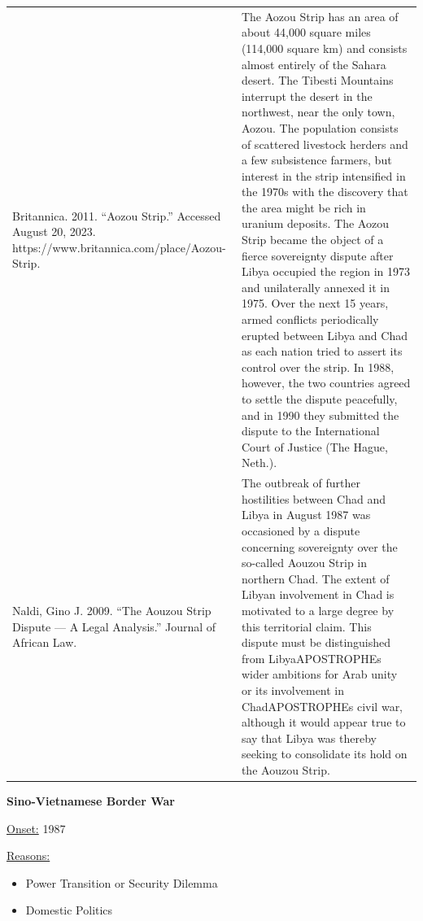 {\begin{longtable}{p{}p{}}
\\
Britannica. 2011. “Aozou Strip.” Accessed August 20, 2023. https://www.britannica.com/place/Aozou-Strip. & The Aozou Strip has an area of about 44,000 square miles (114,000 square km) and consists almost entirely of the Sahara desert. The Tibesti Mountains interrupt the desert in the northwest, near the only town, Aozou. The population consists of scattered livestock herders and a few subsistence farmers, but interest in the strip intensified in the 1970s with the discovery that the area might be rich in uranium deposits. The Aozou Strip became the object of a fierce sovereignty dispute after Libya occupied the region in 1973 and unilaterally annexed it in 1975. Over the next 15 years, armed conflicts periodically erupted between Libya and Chad as each nation tried to assert its control over the strip. In 1988, however, the two countries agreed to settle the dispute peacefully, and in 1990 they submitted the dispute to the International Court of Justice (The Hague, Neth.).
\\
Naldi, Gino J. 2009. “The Aouzou Strip Dispute — A Legal Analysis.” Journal of African Law. & The outbreak of further hostilities between Chad and Libya in August 1987 was occasioned by a dispute concerning sovereignty over the so-called Aouzou Strip in northern Chad. The extent of Libyan involvement in Chad is motivated to a large degree by this territorial claim. This dispute must be distinguished from LibyaAPOSTROPHEs wider ambitions for Arab unity or its involvement in ChadAPOSTROPHEs civil war, although it would appear true to say that Libya was thereby seeking to consolidate its hold on the Aouzou Strip.
\\
\end{longtable}}
\clearpage
         \textbf{Sino-Vietnamese Border War} 

          \underline{Onset:} 1987         

\underline{Reasons:}
\begin{itemize}
\item Power Transition or Security Dilemma
\item Domestic Politics
\end{itemize}

